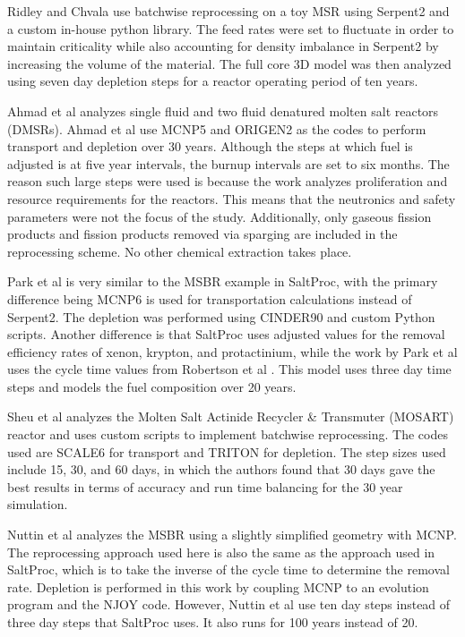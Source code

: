 Ridley and Chvala \cite{ridley_method_2017} use batchwise reprocessing on a toy MSR using Serpent2 and a custom in-house python library. The feed rates were set to fluctuate in order to maintain criticality while also accounting for density imbalance in Serpent2 by increasing the volume of the material. The full core 3D model was then analyzed using seven day depletion steps for a reactor operating period of ten years.

Ahmad et al \cite{ahmad_neutronics_2015} analyzes single fluid and two fluid denatured molten salt reactors (DMSRs). Ahmad et al use MCNP5 and ORIGEN2 as the codes to perform transport and depletion over 30 years. Although the steps at which fuel is adjusted is at five year intervals, the burnup intervals are set to six months. The reason such large steps were used is because the work analyzes proliferation and resource requirements for the reactors. This means that the neutronics and safety parameters were not the focus of the study. Additionally, only gaseous fission products and fission products removed via sparging are included in the reprocessing scheme. No other chemical extraction takes place.

Park et al \cite{park_whole_2015} is very similar to the MSBR example in SaltProc, with the primary difference being MCNP6 is used for transportation calculations instead of Serpent2. The depletion was performed using CINDER90 and custom Python scripts. Another difference is that SaltProc uses adjusted values for the removal efficiency rates of xenon, krypton, and protactinium, while the work by Park et al uses the cycle time values from Robertson et al \cite{robertson_conceptual_1971}. This model uses three day time steps and models the fuel composition over 20 years.

Sheu et al \cite{sheu_depletion_2013} analyzes the Molten Salt Actinide Recycler \& Transmuter (MOSART) reactor and uses custom scripts to implement batchwise reprocessing. The codes used are SCALE6 for transport and TRITON for depletion. The step sizes used include 15, 30, and 60 days, in which the authors found that 30 days gave the best results in terms of accuracy and run time balancing for the 30 year simulation.

Nuttin et al \cite{nuttin_potential_2005} analyzes the MSBR using a slightly simplified geometry with MCNP. The reprocessing approach used here is also the same as the approach used in SaltProc, which is to take the inverse of the cycle time to determine the removal rate. Depletion is performed in this work by coupling MCNP to an evolution program and the NJOY code. However, Nuttin et al use ten day steps instead of three day steps that SaltProc uses. It also runs for 100 years instead of 20.

